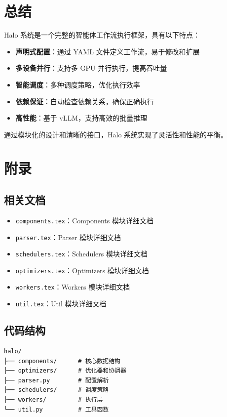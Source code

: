 \documentclass[12pt,a4paper]{article}
\begin{document}
\section{总结}

Halo 系统是一个完整的智能体工作流执行框架，具有以下特点：

\begin{itemize}
    \item \textbf{声明式配置}：通过 YAML 文件定义工作流，易于修改和扩展
    \item \textbf{多设备并行}：支持多 GPU 并行执行，提高吞吐量
    \item \textbf{智能调度}：多种调度策略，优化执行效率
    \item \textbf{依赖保证}：自动检查依赖关系，确保正确执行
    \item \textbf{高性能}：基于 vLLM，支持高效的批量推理
\end{itemize}

通过模块化的设计和清晰的接口，Halo 系统实现了灵活性和性能的平衡。

\section{附录}

\subsection{相关文档}

\begin{itemize}
    \item \texttt{components.tex}：Components 模块详细文档
    \item \texttt{parser.tex}：Parser 模块详细文档
    \item \texttt{schedulers.tex}：Schedulers 模块详细文档
    \item \texttt{optimizers.tex}：Optimizers 模块详细文档
    \item \texttt{workers.tex}：Workers 模块详细文档
    \item \texttt{util.tex}：Util 模块详细文档
\end{itemize}

\subsection{代码结构}

\begin{verbatim}
halo/
├── components/      # 核心数据结构
├── optimizers/      # 优化器和协调器
├── parser.py        # 配置解析
├── schedulers/      # 调度策略
├── workers/         # 执行层
└── util.py          # 工具函数
\end{verbatim}
\end{document}
